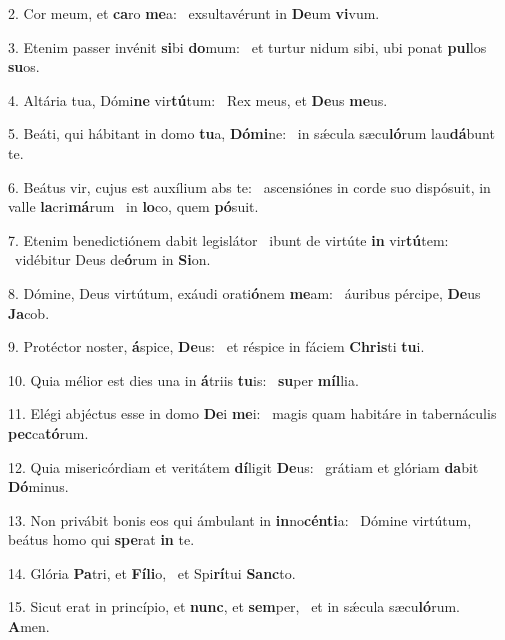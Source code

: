 2. Cor meum, et \textbf{ca}ro \textbf{me}a: \ast\  exsultavérunt in \textbf{De}um \textbf{vi}vum.\

3. Etenim passer invénit \textbf{si}bi \textbf{do}mum: \ast\  et turtur nidum sibi, ubi ponat \textbf{pul}los \textbf{su}os.\

4. Altária tua, Dómi\textbf{ne} vir\textbf{tú}tum: \ast\  Rex meus, et \textbf{De}us \textbf{me}us.\

5. Beáti, qui hábitant in domo \textbf{tu}a, \textbf{Dó}\textbf{mi}ne: \ast\  in sǽcula sæcu\textbf{ló}rum lau\textbf{dá}bunt te.\

6. Beátus vir, cujus est auxílium abs te: \dag\  ascensiónes in corde suo dispósuit, in valle \textbf{la}cri\textbf{má}rum \ast\  in \textbf{lo}co, quem \textbf{pó}suit.\

7. Etenim benedictiónem dabit legislátor \dag\  ibunt de virtúte \textbf{in} vir\textbf{tú}tem: \ast\  vidébitur Deus de\textbf{ó}rum in \textbf{Si}on.\

8. Dómine, Deus virtútum, exáudi orati\textbf{ó}nem \textbf{me}am: \ast\  áuribus pércipe, \textbf{De}us \textbf{Ja}cob.\

9. Protéctor noster, \textbf{á}spice, \textbf{De}us: \ast\  et réspice in fáciem \textbf{Chris}ti \textbf{tu}i.\

10. Quia mélior est dies una in \textbf{á}triis \textbf{tu}is: \ast\  \textbf{su}per \textbf{míl}lia.\

11. Elégi abjéctus esse in domo \textbf{De}i \textbf{me}i: \ast\  magis quam habitáre in tabernáculis \textbf{pec}ca\textbf{tó}rum.\

12. Quia misericórdiam et veritátem \textbf{dí}ligit \textbf{De}us: \ast\  grátiam et glóriam \textbf{da}bit \textbf{Dó}minus.\

13. Non privábit bonis eos qui ámbulant in \textbf{in}no\textbf{cén}\textbf{ti}a: \ast\  Dómine virtútum, beátus homo qui \textbf{spe}rat \textbf{in} te.\

14. Glória \textbf{Pa}tri, et \textbf{Fí}\textbf{li}o, \ast\  et Spi\textbf{rí}tui \textbf{Sanc}to.\

15. Sicut erat in princípio, et \textbf{nunc}, et \textbf{sem}per, \ast\  et in sǽcula sæcu\textbf{ló}rum. \textbf{A}men.\

